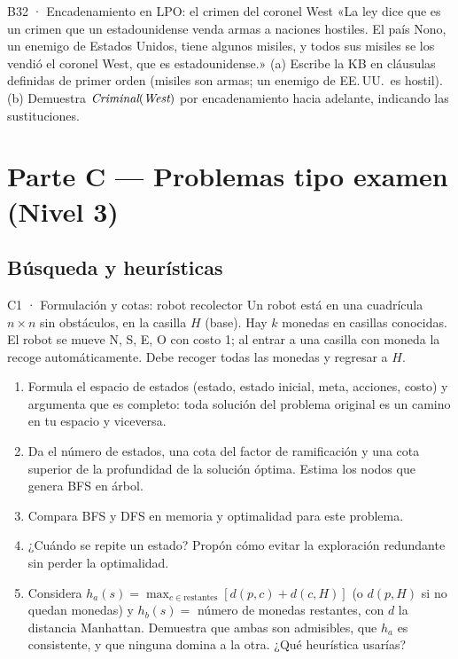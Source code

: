 \begin{ejercicio}{B32 · Encadenamiento en LPO: el crimen del coronel West }
«La ley dice que es un crimen que un estadounidense venda armas a naciones hostiles. El país Nono, un
enemigo de Estados Unidos, tiene algunos misiles, y todos sus misiles se los vendió el coronel West,
que es estadounidense.»
(a) Escribe la KB en cláusulas definidas de primer orden (misiles son armas; un enemigo de EE.\,UU.\ es hostil).
(b) Demuestra $\textit{Criminal}(\textit{West})$ por encadenamiento hacia adelante, indicando las sustituciones.
\end{ejercicio}

\newpage
\section{Parte C — Problemas tipo examen (Nivel 3)}

\subsection{Búsqueda y heurísticas}

\begin{ejercicio}{C1 · Formulación y cotas: robot recolector }
Un robot está en una cuadrícula $n\times n$ sin obstáculos, en la casilla $H$ (base). Hay $k$ monedas
en casillas conocidas. El robot se mueve N, S, E, O con costo 1; al entrar a una casilla con moneda
la recoge automáticamente. Debe recoger todas las monedas y regresar a $H$.
\begin{enumerate}[label=(\alph*)]
\item Formula el espacio de estados (estado, estado inicial, meta, acciones, costo) y argumenta que
es completo: toda solución del problema original es un camino en tu espacio y viceversa.
\item Da el número de estados, una cota del factor de ramificación y una cota superior de la
profundidad de la solución óptima. Estima los nodos que genera BFS en árbol.
\item Compara BFS y DFS en memoria y optimalidad para este problema.
\item ¿Cuándo se repite un estado? Propón cómo evitar la exploración redundante sin perder la
optimalidad.
\item Considera $h_a(s)=\max_{c\in\text{restantes}}[d(p,c)+d(c,H)]$ (o $d(p,H)$ si no quedan
monedas) y $h_b(s)=$ número de monedas restantes, con $d$ la distancia Manhattan. Demuestra que
ambas son admisibles, que $h_a$ es consistente, y que ninguna domina a la otra. ¿Qué heurística usarías?
\end{enumerate}
\end{ejercicio}


